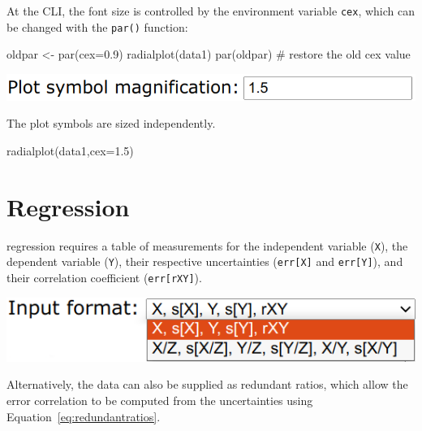 \begin{refsection}
\begin{enumerate}
At the CLI, the font size is controlled by the environment variable
\texttt{cex}, which can be changed with the \texttt{par()} function:

\begin{script}
oldpar <- par(cex=0.9)
radialplot(data1)
par(oldpar) # restore the old cex value
\end{script}

\noindent\begin{minipage}[t]{.5\linewidth}
\strut\vspace*{-\baselineskip}\newline
\includegraphics[width=\linewidth]{../figures/OtherRadialPCHcex.png}
\end{minipage}
\begin{minipage}[t]{.5\linewidth}
The plot symbols are sized independently.
\end{minipage}

\begin{console}
radialplot(data1,cex=1.5)
\end{console}

\end{enumerate}

\section{Regression}\label{sec:OtherRegression}

\citet{york2004} regression requires a table of measurements for the
independent variable (\texttt{X}), the dependent variable
(\texttt{Y}), their respective uncertainties (\texttt{err[X]} and
\texttt{err[Y]}), and their correlation coefficient
(\texttt{err[rXY]}).\\

\noindent\begin{minipage}[t]{.45\linewidth}
  \strut\vspace*{-\baselineskip}\newline
  \includegraphics[width=\linewidth]{../figures/OtherRegressionInput.png}
\end{minipage}
\begin{minipage}[t]{.55\linewidth}
  Alternatively, the data can also be supplied as redundant ratios,
  which allow the error correlation to be computed from the
  uncertainties using Equation~\ref{eq:redundantratios}.
\end{minipage}


\end{refsection}
